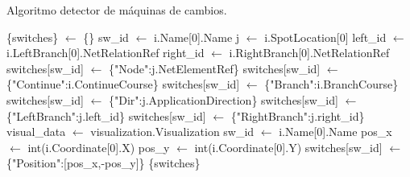     \begin{algorithm}
            \caption{Algoritmo detector de máquinas de cambios.}
            \label{alg:switches}
            \begin{algorithmic}
                \STATE \{switches\} $\gets$ \{\}
                            \STATE sw\_id $\gets$ i.Name[0].Name
                            \STATE j $\gets$ i.SpotLocation[0]
                            \STATE left\_id $\gets$ i.LeftBranch[0].NetRelationRef
                            \STATE right\_id $\gets$ i.RightBranch[0].NetRelationRef
                            \STATE switches[sw\_id] $\gets$ \{"Node":j.NetElementRef\}
                            \STATE switches[sw\_id] $\gets$ \{"Continue":i.ContinueCourse\}
                            \STATE switches[sw\_id] $\gets$ \{"Branch":i.BranchCourse\}
                            \STATE switches[sw\_id] $\gets$ \{"Dir":j.ApplicationDirection\}
                            \STATE switches[sw\_id] $\gets$ \{"LeftBranch":j.left\_id\}
                            \STATE switches[sw\_id] $\gets$ \{"RightBranch":j.right\_id\}
                        \ENDIF
                    \ENDFOR
                \ENDIF
                \STATE visual\_data $\gets$ visualization.Visualization
                        \STATE sw\_id $\gets$ i.Name[0].Name
                            \STATE pos\_x $\gets$ int(i.Coordinate[0].X)
                            \STATE pos\_y $\gets$ int(i.Coordinate[0].Y)
                            \STATE switches[sw\_id] $\gets$ \{"Position":[pos\_x,-pos\_y]\}
                        \ENDIF 
                    \ENDFOR
                \ENDIF
            \OUTPUT \{switches\}
            \end{algorithmic}
        \end{algorithm}